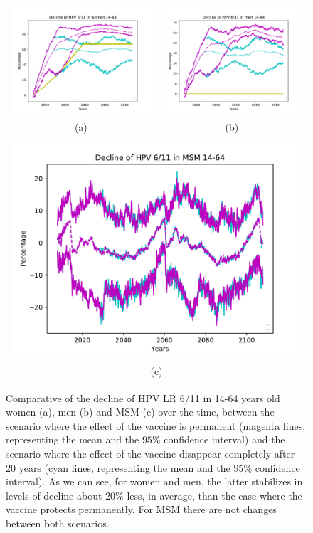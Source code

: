 \begin{figure}[!]
	\centering
	\begin{tabular}{cc}
		\includegraphics[width=0.5\linewidth]{IMGs/6.-Caida_brusca/verr_muj.pdf}	& 
		\includegraphics[width=0.5\linewidth]{IMGs/6.-Caida_brusca/verr_hom.pdf}  \\ 
		(a)	& (b) \\ 
		\multicolumn{2}{c}{ \includegraphics[width=0.5\linewidth]{IMGs/6.-Caida_brusca/verr_MSM.pdf} } \\ 
		\multicolumn{2}{c}{(c)} \\ 
	\end{tabular} 
	\caption{Comparative of the decline of HPV LR 6/11 in 14-64 years old women (a), men (b) and MSM (c) over the time, between the scenario where the effect of the vaccine is permanent (magenta lines, representing  the mean and the $95\%$ confidence interval) and the scenario where the effect of the vaccine disappear completely after $20$ years (cyan lines, representing  the mean and the $95\%$ confidence interval). As we can see, for women and men, the latter stabilizes in levels of decline about $20\%$ less, in average, than the case where the vaccine protects permanently. For MSM there are not changes between both scenarios.}
	\label{fig:dropLRESP}
\end{figure}

